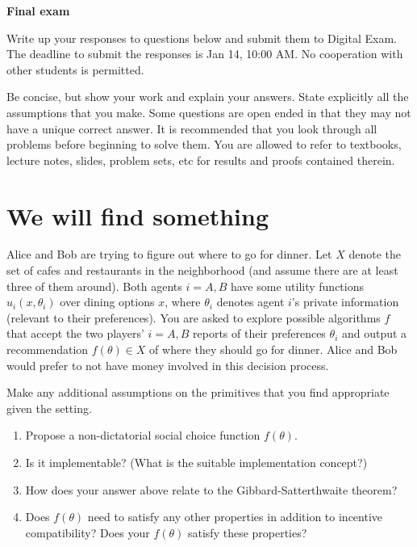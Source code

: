 \documentclass[a4paper]{article}
\newif\ifsolutions
\begin{document}
{\ifsolutions \else	
	
\fi}

\begin{center}
		\LARGE\textbf{Final exam {\ifsolutions solutions \fi}}
\end{center}

{\ifsolutions \else	
Write up your responses to questions below and submit them to Digital Exam. The deadline to submit the responses is Jan 14, 10:00 AM. No cooperation with other students is permitted.

Be concise, but show your work and explain your answers. State explicitly all the assumptions that you make. Some questions are open ended in that they may not have a unique correct answer. It is recommended that you look through all problems before beginning to solve them. You are allowed to refer to textbooks, lecture notes, slides, problem sets, etc for results and proofs contained therein.
\fi}


\section{We will find something}
	
	Alice and Bob are trying to figure out where to go for dinner. Let $X$ denote the set of cafes and restaurants in the neighborhood (and assume there are at least three of them around). Both agents $i=A,B$ have some utility functions $u_i(x,\theta_i)$ over dining options $x$, where $\theta_i$ denotes agent $i$'s private information (relevant to their preferences). You are asked to explore possible algorithms $f$ that accept the two players' $i=A,B$ reports of their preferences $\theta_i$ and output a recommendation $f(\theta) \in X$ of where they should go for dinner. Alice and Bob would prefer to not have money involved in this decision process.
	
	Make any additional assumptions on the primitives that you find appropriate given the setting.
	
	\begin{enumerate}
		\item Propose a non-dictatorial social choice function $f(\theta)$.
		\item Is it implementable? (What is the suitable implementation concept?)
		\item How does your answer above relate to the Gibbard-Satterthwaite theorem?
		\item Does $f(\theta)$ need to satisfy any other properties in addition to incentive compatibility? Does your $f(\theta)$ satisfy these properties?
	\end{enumerate}
	
\end{document}
